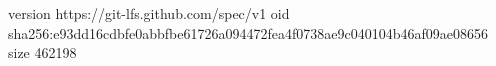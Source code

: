 version https://git-lfs.github.com/spec/v1
oid sha256:e93dd16cdbfe0abbfbe61726a094472fea4f0738ae9c040104b46af09ae08656
size 462198
